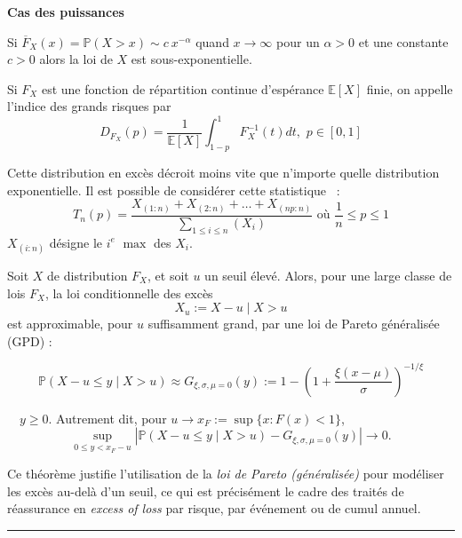 \begin{f}
	
	\textbf{Cas des puissances} 
	
	Si $\overline{F}_{X}(x)=\mathbb{P}(X > x)\sim c\ x^{-\alpha}$
		quand $x \to \infty $ pour un $\alpha > 0 $ et une constante $c > 0 $ alors la loi de $X$
		est sous-exponentielle.
	
		Si $F_X$ est une fonction de répartition continue d'espérance $\mathbb{E}[X]$ finie, on appelle l'indice des grands risques par
		$$
		D_{F_X}(p)=\frac{1}{\mathbb{E}[X]}\int_{1-p}^{1} F_X^{-1}(t)dt,\, \, p\in [0,1]
		$$

	Cette distribution en excès décroit moins vite que n'importe quelle distribution exponentielle.
	Il est possible de considérer cette statistique ~:
	$$
	T_n(p)=\frac{X_{(1:n)}+X_{(2:n)}+\ldots + X_{(np:n)}}{\sum_{1\leq i\leq n}(X_i)} \mbox{ où } \frac{1}{n}\leq p\leq 1
	$$
	$X_{(i:n)}$ désigne le $i^e$ $\max $ des $X_i$.

\end{f}
\begin{f}
	Soit $X$ de distribution $F_X$, et soit $u$ un seuil élevé. Alors, pour une large classe de lois $F_X$, la loi conditionnelle des excès
	\[
	X_u := X - u \mid X > u
	\]
	est approximable, pour $u$ suffisamment grand, par une loi de Pareto généralisée (GPD) :
	
	\[
	\mathbb{P}(X - u \le y \mid X > u) \approx G_{\xi, \sigma, \mu=0}(y) :=  1 - \left(1+ \frac{\xi(x-\mu)}{\sigma}\right)^{-1/\xi} 
	\]
	
	$\quad y \ge 0$. Autrement dit, pour $u \to x_F := \sup\{x : F(x) < 1\}$,
	\[
	\sup_{0 \le y < x_F - u} \left| \mathbb{P}(X - u \le y \mid X > u) - G_{\xi,\sigma,\mu=0}(y) \right| \to 0.
	\]
	
	Ce théorème justifie l’utilisation de la \textit{loi de Pareto (généralisée)} pour modéliser les excès au-delà d’un seuil, ce qui est précisément le cadre des traités de réassurance en \textit{excess of loss} par risque, par événement ou de cumul annuel. 
\end{f}
\hrule


